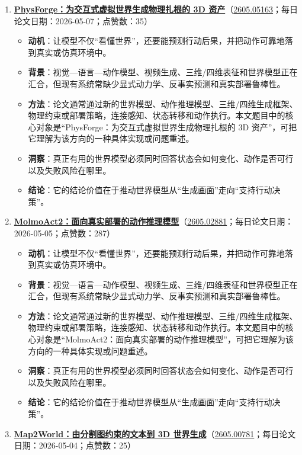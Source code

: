 \begin{enumerate}[leftmargin=1.5em]
\begin{itemize}[leftmargin=1.5em]
  \end{itemize}
  \item \textbf{\href{https://huggingface.co/papers/2605.05163}{PhysForge：为交互式虚拟世界生成物理扎根的 3D 资产}}（\href{https://arxiv.org/abs/2605.05163}{2605.05163}；每日论文日期：2026-05-07；点赞数：35）
  \begin{itemize}[leftmargin=1.5em]
    \item \textbf{动机}：让模型不仅“看懂世界”，还要能预测行动后果，并把动作可靠地落到真实或仿真环境中。
    \item \textbf{背景}：视觉—语言—动作模型、视频生成、三维/四维表征和世界模型正在汇合，但现有系统常缺少显式动力学、反事实预测和真实部署鲁棒性。
    \item \textbf{方法}：论文通常通过新的世界模型、动作推理模型、三维/四维生成框架、物理约束或部署策略，连接感知、状态转移和动作执行。本文题目中的核心对象是“PhysForge：为交互式虚拟世界生成物理扎根的 3D 资产”，可把它理解为该方向的一种具体实现或问题重述。
    \item \textbf{洞察}：真正有用的世界模型必须同时回答状态会如何变化、动作是否可行以及失败风险在哪里。
    \item \textbf{结论}：它的结论价值在于推动世界模型从“生成画面”走向“支持行动决策”。
  \end{itemize}
  \item \textbf{\href{https://huggingface.co/papers/2605.02881}{MolmoAct2：面向真实部署的动作推理模型}}（\href{https://arxiv.org/abs/2605.02881}{2605.02881}；每日论文日期：2026-05-05；点赞数：287）
  \begin{itemize}[leftmargin=1.5em]
    \item \textbf{动机}：让模型不仅“看懂世界”，还要能预测行动后果，并把动作可靠地落到真实或仿真环境中。
    \item \textbf{背景}：视觉—语言—动作模型、视频生成、三维/四维表征和世界模型正在汇合，但现有系统常缺少显式动力学、反事实预测和真实部署鲁棒性。
    \item \textbf{方法}：论文通常通过新的世界模型、动作推理模型、三维/四维生成框架、物理约束或部署策略，连接感知、状态转移和动作执行。本文题目中的核心对象是“MolmoAct2：面向真实部署的动作推理模型”，可把它理解为该方向的一种具体实现或问题重述。
    \item \textbf{洞察}：真正有用的世界模型必须同时回答状态会如何变化、动作是否可行以及失败风险在哪里。
    \item \textbf{结论}：它的结论价值在于推动世界模型从“生成画面”走向“支持行动决策”。
  \end{itemize}
  \item \textbf{\href{https://huggingface.co/papers/2605.00781}{Map2World：由分割图约束的文本到 3D 世界生成}}（\href{https://arxiv.org/abs/2605.00781}{2605.00781}；每日论文日期：2026-05-04；点赞数：25）

\end{enumerate}
